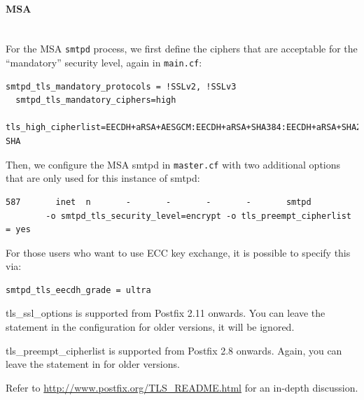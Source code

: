 \begin{description}
\paragraph*{MSA}\mbox{}\\

For the MSA \verb|smtpd| process, we first define the ciphers that are
acceptable for the ``mandatory'' security level, again in
\verb|main.cf|:

\begin{lstlisting}[breaklines]
  smtpd_tls_mandatory_protocols = !SSLv2, !SSLv3
  smtpd_tls_mandatory_ciphers=high
  tls_high_cipherlist=EECDH+aRSA+AESGCM:EECDH+aRSA+SHA384:EECDH+aRSA+SHA256:EDH+CAMELLIA256:EECDH:EDH+aRSA:+SSLv3:!aNULL:!eNULL:!LOW:!3DES:!MD5:!EXP:!PSK:!SRP:!DSS:!RC4:!SEED:!AES128:!CAMELLIA128:!ECDSA:AES256-SHA
\end{lstlisting}

Then, we configure the MSA smtpd in \verb|master.cf| with two
additional options that are only used for this instance of smtpd:

\begin{lstlisting}[breaklines]
587       inet  n       -       -       -       -       smtpd 
        -o smtpd_tls_security_level=encrypt -o tls_preempt_cipherlist = yes
\end{lstlisting}

For those users who want to use ECC key exchange, it is possible to specify this via:
\begin{lstlisting}[breaklines]
  smtpd_tls_eecdh_grade = ultra
\end{lstlisting}

\item[Limitations:] \mbox{}

tls\_ssl\_options is supported from Postfix 2.11 onwards. You can
leave the statement in the configuration for older versions, it will
be ignored.

tls\_preempt\_cipherlist is supported from Postfix 2.8 onwards. Again,
you can leave the statement in for older versions.

\item[References:]

Refer to \url{http://www.postfix.org/TLS_README.html} for an in-depth
discussion.




\end{description}
